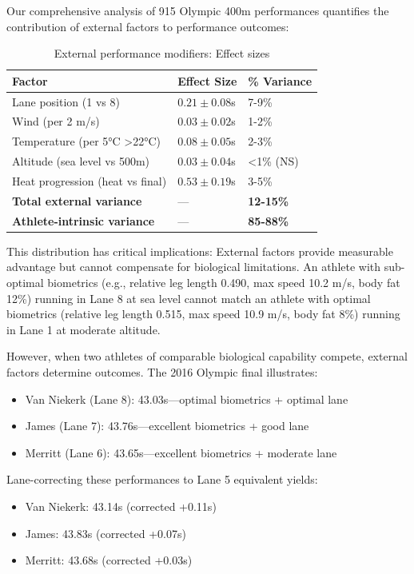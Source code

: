 \documentclass[12pt]{article}
\begin{document}
Our comprehensive analysis of 915 Olympic 400m performances quantifies the contribution of external factors to performance outcomes:

\begin{table}[H]
\centering
\caption{External performance modifiers: Effect sizes}
\begin{tabular}{@{}lll@{}}
\toprule
\textbf{Factor} & \textbf{Effect Size} & \textbf{\% Variance} \\
\midrule
Lane position (1 vs 8) & $0.21 \pm 0.08$s & 7-9\% \\
Wind (per 2 m/s) & $0.03 \pm 0.02$s & 1-2\% \\
Temperature (per 5°C >22°C) & $0.08 \pm 0.05$s & 2-3\% \\
Altitude (sea level vs 500m) & $0.03 \pm 0.04$s & <1\% (NS) \\
Heat progression (heat vs final) & $0.53 \pm 0.19$s & 3-5\% \\
\midrule
\textbf{Total external variance} & — & \textbf{12-15\%} \\
\textbf{Athlete-intrinsic variance} & — & \textbf{85-88\%} \\
\bottomrule
\end{tabular}
\end{table}

This distribution has critical implications: External factors provide measurable advantage but cannot compensate for biological limitations. An athlete with sub-optimal biometrics (e.g., relative leg length 0.490, max speed 10.2 m/s, body fat 12\%) running in Lane 8 at sea level cannot match an athlete with optimal biometrics (relative leg length 0.515, max speed 10.9 m/s, body fat 8\%) running in Lane 1 at moderate altitude.

However, when two athletes of comparable biological capability compete, external factors determine outcomes. The 2016 Olympic final illustrates:
\begin{itemize}
    \item Van Niekerk (Lane 8): 43.03s—optimal biometrics + optimal lane
    \item James (Lane 7): 43.76s—excellent biometrics + good lane
    \item Merritt (Lane 6): 43.65s—excellent biometrics + moderate lane
\end{itemize}

Lane-correcting these performances to Lane 5 equivalent yields:
\begin{itemize}
    \item Van Niekerk: 43.14s (corrected +0.11s)
    \item James: 43.83s (corrected +0.07s)
    \item Merritt: 43.68s (corrected +0.03s)
\end{itemize}
\end{document}
